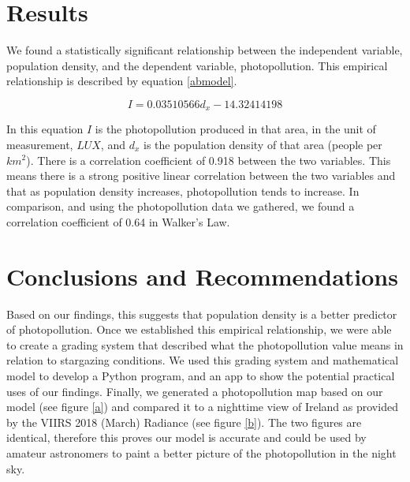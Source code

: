 \documentclass[12pt]{titlepage}
\begin{document}
\section*{Results} 
We found a statistically significant relationship between the independent variable, population density, and the dependent variable, photopollution. This empirical relationship is described by equation \ref{abmodel}. 

\begin{equation} 
\label{abmodel} 
I = 0.03510566 d_x - 14.32414198 
\end{equation} 

In this equation $I$ is the photopollution produced in that area, in the unit of measurement, $LUX$, and $d_x$ is the population density of that area (people per $km^{2}$). There is a correlation coefficient of 0.918 between the two variables. This means there is a strong positive linear correlation between the two variables and that as population density increases, photopollution tends to increase. In comparison, and using the photopollution data we gathered, we found a correlation coefficient of 0.64 in Walker's Law.

\section*{Conclusions and Recommendations} 
Based on our findings, this suggests that population density is a better predictor of  photopollution.  Once we established this empirical relationship, we were able to create a grading system that described what the photopollution value means in relation to stargazing conditions. We used this grading system and mathematical model to develop a Python program, and an app to show the potential practical uses of our findings. Finally, we generated a photopollution map based on our model (see figure \ref{a}) and compared it to a nighttime view of Ireland as provided by the VIIRS 2018 (March) Radiance (see figure \ref{b}). The two figures are identical, therefore this proves our model is accurate and could be used by amateur astronomers to paint a better picture of the photopollution in the night sky.
\end{document}
